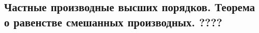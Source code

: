 {
\subsection{Частные производные высших порядков. Теорема о равенстве смешанных производных.  ????}
}